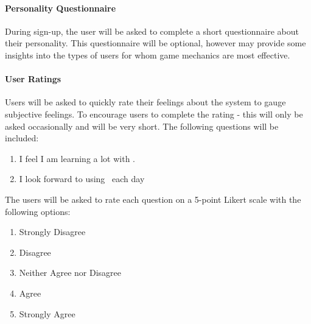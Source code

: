 \paragraph{Personality Questionnaire}
During sign-up, the user will be asked to complete a short questionnaire about their personality. This questionnaire will be optional, however may provide some insights into the types of users for whom game mechanics are most effective. 

\paragraph{User Ratings}
Users will be asked to quickly rate their feelings about the system to gauge subjective feelings. To encourage users to complete the rating - this will only be asked occasionally and will be very short. The following questions will be included:

\begin{enumerate}
    \item I feel I am learning a lot with \SoftName.
    \item I look forward to using \SoftName\ each day
\end{enumerate}

The users will be asked to rate each question on a 5-point Likert scale \cite{likert_technique_1932} with the following options:
\begin{enumerate}
	\item Strongly Disagree
	\item Disagree
	\item Neither Agree nor Disagree
	\item Agree
	\item Strongly Agree
\end{enumerate}
